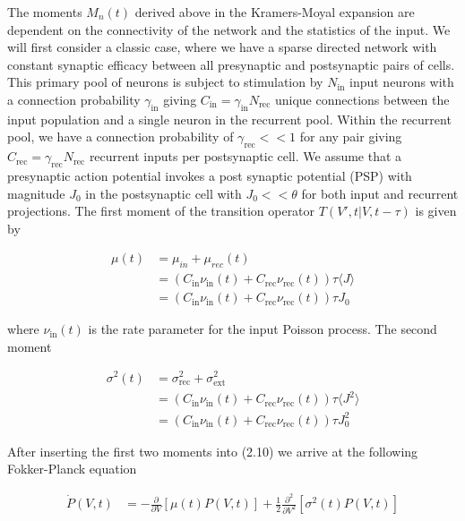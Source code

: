 \documentclass{ucetd}
\begin{document}
The moments $M_{n}(t)$ derived above in the Kramers-Moyal expansion are dependent on the connectivity of the network and the statistics of the input. We will first consider a classic case, where we have a sparse directed network with constant synaptic efficacy between all presynaptic and postsynaptic pairs of cells. This primary pool of neurons is subject to stimulation by $N_{\mathrm{in}}$ input neurons with a connection probability $\gamma_{\mathrm{in}}$ giving $C_{\mathrm{in}} = \gamma_{\mathrm{in}}N_{\mathrm{rec}}$ unique connections between the input population and a single neuron in the recurrent pool. Within the recurrent pool, we have a connection probability of $\gamma_{\mathrm{rec}} << 1$ for any pair giving $C_{\mathrm{rec}} = \gamma_{\mathrm{rec}} N_{\mathrm{rec}}$ recurrent inputs per postsynaptic cell. We assume that a presynaptic action potential invokes a post synaptic potential (PSP) with magnitude $J_{0}$ in the postsynaptic cell with $J_{0} << \theta$ for both input and recurrent projections. The first moment of the transition operator $T(V',t| V,t-\tau)$ is given by

\begin{align*}
\mu(t) &= \mu_{in} + \mu_{rec}(t)\\
&= \left(C_{\mathrm{in}}\nu_{\mathrm{in}}(t) + C_{\mathrm{rec}}\nu_{\mathrm{rec}}(t)\right)\tau\langle J\rangle\\
&= \left(C_{\mathrm{in}}\nu_{\mathrm{in}}(t) + C_{\mathrm{rec}}\nu_{\mathrm{rec}}(t)\right)\tau J_{0}
\end{align*}

where $\nu_{\mathrm{in}}(t)$ is the rate parameter for the input Poisson process. The second moment

\begin{align*}
\sigma^{2}(t) &= \sigma_{\mathrm{rec}}^{2} + \sigma_{\mathrm{ext}}^{2}\\
&= \left(C_{\mathrm{in}}\nu_{\mathrm{in}}(t) + C_{\mathrm{rec}}\nu_{\mathrm{rec}}(t)\right)\tau\langle J^{2}\rangle\\
&= \left(C_{\mathrm{in}}\nu_{\mathrm{in}}(t) + C_{\mathrm{rec}}\nu_{\mathrm{rec}}(t)\right)\tau J_{0}^{2}
\end{align*}

After inserting the first two moments into (2.10) we arrive at the following Fokker-Planck equation

\begin{align*}
\dot{P}(V,t) &= -\frac{\partial}{\partial V}[\mu(t)P(V,t)] + \frac{1}{2}\frac{\partial^{2}}{\partial V^{2}}[\sigma^{2}(t)P(V,t)]\\
\end{align*} 
\end{document}
